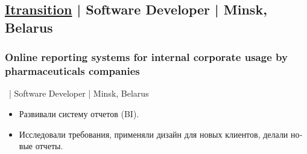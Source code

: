 \documentclass[a4paper]{article}
\begin{document}
\begin{minipage}[t]{0.55\textwidth}
    \subsection*{\href{http://www.itransition.com/}{Itransition} | Software Developer | Minsk, Belarus}
	\subsubsection*{Online reporting systems for internal corporate usage by pharmaceuticals companies}
    \ | Software Developer | Minsk, Belarus
	\begin{otherlanguage}{russian}
      \begin{itemize}
        \item Развивали систему отчетов (BI). 
        \item Исследовали требования, применяли дизайн для новых клиентов, делали новые отчеты.
      \end{itemize}
	\end{otherlanguage}

  \end{minipage}
\end{document}
